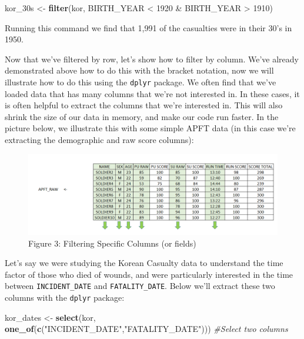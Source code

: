\documentclass[]{book}
\newenvironment{Shaded}{\begin{snugshade}}{\end{snugshade}}
\newcommand{\KeywordTok}[1]{\textcolor[rgb]{0.13,0.29,0.53}{\textbf{{#1}}}}
\newcommand{\DecValTok}[1]{\textcolor[rgb]{0.00,0.00,0.81}{{#1}}}
\newcommand{\StringTok}[1]{\textcolor[rgb]{0.31,0.60,0.02}{{#1}}}
\newcommand{\CommentTok}[1]{\textcolor[rgb]{0.56,0.35,0.01}{\textit{{#1}}}}
\newcommand{\NormalTok}[1]{{#1}}
\begin{document}
\begin{Shaded}
\begin{Highlighting}[]
\NormalTok{kor_30s <-}\StringTok{ }\KeywordTok{filter}\NormalTok{(kor, BIRTH_YEAR <}\StringTok{ }\DecValTok{1920} \NormalTok{&}\StringTok{ }\NormalTok{BIRTH_YEAR >}\StringTok{ }\DecValTok{1910}\NormalTok{)}
\end{Highlighting}
\end{Shaded}

Running this command we find that 1,991 of the casualties were in their
30's in 1950.

Now that we've filtered by row, let's show how to filter by column.
We've already demonstrated above how to do this with the bracket
notation, now we will illustrate how to do this using the \texttt{dplyr}
package. We often find that we've loaded data that has many columns that
we're not interested in. In these cases, it is often helpful to extract
the columns that we're interested in. This will also shrink the size of
our data in memory, and make our code run faster. In the picture below,
we illustrate this with some simple APFT data (in this case we're
extracting the demographic and raw score columns):

\begin{figure}[htbp]
\centering
\includegraphics{filterColumn.PNG}
\caption{Figure 3: Filtering Specific Columns (or fields)}
\end{figure}

Let's say we were studying the Korean Casualty data to understand the
time factor of those who died of wounds, and were particularly
interested in the time between \texttt{INCIDENT\_DATE} and
\texttt{FATALITY\_DATE}. Below we'll extract these two columns with the
\texttt{dplyr} package:

\begin{Shaded}
\begin{Highlighting}[]
\NormalTok{kor_dates <-}\StringTok{ }\KeywordTok{select}\NormalTok{(kor, }\KeywordTok{one_of}\NormalTok{(}\KeywordTok{c}\NormalTok{(}\StringTok{"INCIDENT_DATE"}\NormalTok{,}\StringTok{"FATALITY_DATE"}\NormalTok{))) }\CommentTok{#Select two columns}
\end{Highlighting}
\end{Shaded}
\end{document}
